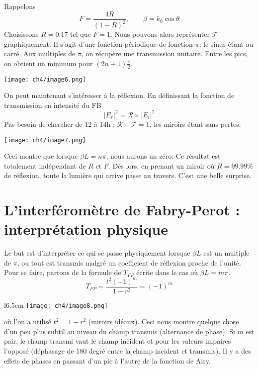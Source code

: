 Rappelons 
\begin{equation}
F = \dfrac{4R}{(1-R)^2},\qquad \beta = k_0\cos\theta
\end{equation}
Choisissons $R=0.17$ tel que $F = 1$. Nous pouvons alors représenter $\mathcal{T}$ 
graphiquement. Il s'agit d'une fonction périodique de fonction $\pi$, le sinus étant 
au carré. Aux multiples de $\pi$, on récupère une transmission unitaire. Entre les pics, on 
obtient un minimum pour $(2n+1)\frac{\pi}{2}$.  

\begin{center}
	\texttt{[image: ch4/image6.png]}
\end{center}

On peut maintenant s'intéresser à la réflexion. En définissant la fonction de transmission 
en intensité du FB 
\begin{equation}
|E_r|^2 = \mathcal{R}\times|E_i|^2
\end{equation}
Pas besoin de chercher de 12 à 14h : $\mathcal{R}+\mathcal{T}=1$, les miroirs étant sans 
pertes. 

\begin{center}
	\texttt{[image: ch4/image7.png]}
\end{center}

Ceci montre que lorsque $\beta L = n\pi$, nous aurons un zéro. Ce résultat est totalement 
indépendant de $R$ et $F$. Dès lors, en prenant un miroir où $R=99.99\%$ de réflexion, 
toute la lumière qui arrive passe au travers. C'est une belle surprise. 

\newpage
\section{L'interféromètre de Fabry-Perot : interprétation physique}
Le but est d'interpréter ce qui se passe physiquement lorsque $\beta L$ est un multiple de 
$\pi$, ou tout est transmis malgré un coefficient de réflexion proche de l'unité. Pour se 
faire, partons de la formule de $T_{FP}$ écrite dans le cas où $\beta L = m\pi$.
\begin{equation}
T_{FP} = \frac{t^2(-1)^m}{1-r^2} = (-1)^m
\end{equation}

	\begin{wrapfigure}[10]{l}{6.5cm}
	\vspace{-5mm}
	\texttt{[image: ch4/image8.png]}
	\end{wrapfigure}
où l'on a utilisé $t^2 = 1-r^2$ (miroirs idéaux). Ceci nous montre quelque chose d'un peu 
plus subtil au niveau du champ transmis (alternance de phase). Si $m$ est pair, le champ 
transmi vaut le champ incident et pour les valeurs impaires l'opposé (déphasage de 180 degré 
entre la champ incident et transmis). Il y a des effets de phases en passant d'un pic à l'autre 
de la fonction de Airy. \\

